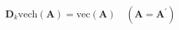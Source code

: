 \begin{equation}
	\mathbf{D}_{k} 
	\mathrm{vech} 
	\left( 
	\mathbf{A} 
	\right)
	=
	\mathrm{vec} 
	\left( 
	\mathbf{A} 
	\right)
	\quad
	\left(
	\mathbf{A}
	=
	\mathbf{A}^{\prime}
	\right)
	\label{eq:linearAlgebra-dcap}
\end{equation}
